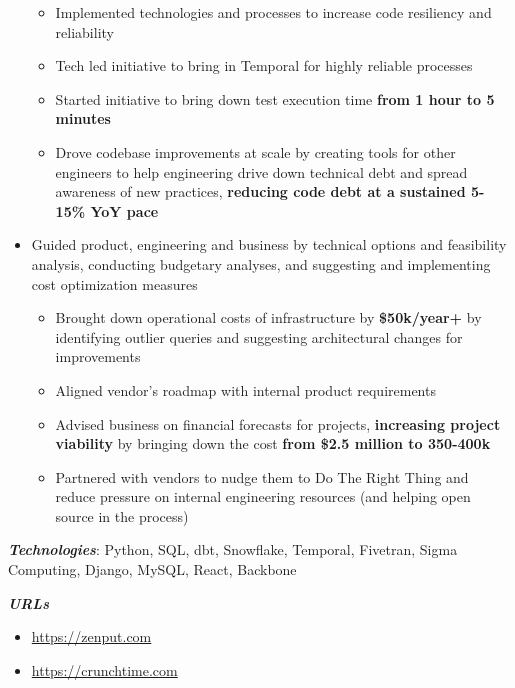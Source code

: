 \documentclass[a4paper]{article}
\newenvironment{jobdetails}%
    {\list{}{\leftmargin=4mm}\item[]}%
    {\endlist}
\begin{document}
\begin{jobdetails}
\begin{itemize}
\begin{itemize}
            \item Implemented technologies and processes to increase code resiliency and reliability
            \item Tech led initiative to bring in Temporal for highly reliable processes
            \item Started initiative to bring down test execution time \textbf{from 1 hour to 5 minutes}
            \item Drove codebase improvements at scale by creating tools for other engineers to help engineering drive down technical debt and spread awareness of new practices, \textbf{reducing code debt at a sustained 5-15\% YoY pace}
        \end{itemize}
    \item Guided product, engineering and business by technical options and feasibility analysis, conducting budgetary analyses, and suggesting and implementing cost optimization measures
        \begin{itemize}
            \small
            \item Brought down operational costs of infrastructure by \textbf{\$50k/year+} by identifying outlier queries and suggesting architectural changes for improvements
            \item Aligned vendor's roadmap with internal product requirements
            \item Advised business on financial forecasts for projects, \textbf{increasing project viability} by bringing down the cost \textbf{from \$2.5 million to 350-400k}
            \item Partnered with vendors to nudge them to Do The Right Thing and reduce pressure on internal engineering resources (and helping open source in the process)
        \end{itemize}
\end{itemize}
\vspace{2mm}

\textbf{\textit{Technologies}}: Python, SQL, dbt, Snowflake, Temporal, Fivetran, Sigma Computing, Django, MySQL, React, Backbone

\textbf{\textit{URLs}}
\begin{itemize} \itemsep 1pt
	\item \url{https://zenput.com}
	\item \url{https://crunchtime.com}
\end{itemize}

\end{jobdetails}
\vspace{1mm}
\end{document}
